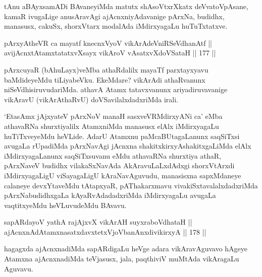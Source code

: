 \begin{artha}
tAnu aBAyxsamADi BAvaneyiMda matutx shAsoVtxrXkatx deVvatoVpAsane,
kamaR ivugaLige anusAravAgi ajAcnxniyAdavanige pArxNa, budidhx,
manasusx, cakuSx, shorxVtarx modalAda iMdirxyagaLu huTuTxtatxve.
\end{artha}


\begin{shl}
pArxyAtheVR ca mayatf knecnxVyoV vikArAdeVniRSeVdhanAtf || \\
avijAcnxtAtamxtatatxvXsayx vikAroV vA\s satxvXdoVSataH \hfill || 177 ||  
\end{shl}

\begin{artha}
pArxcuyaR (bAhuLayx)veMba athaRdalilx mayaTf parxtayxyavu
baMdideyeMdu tiLiyabeVku. EkeMdare? vikArAdi athaRvanunx
niSeVdhisiruvudariMda. athavA Atamx tatavxvanunx ariyadiruvavanige
vikAravU (vikArAthaRvU) doVSavilalxdadxriMda irali.
\end{artha}

\begin{artha}
`EtasAmx jAjxyateV pArxNoV manaH sasxveVRMdirxyANi ca' eMba athavaRNa shurxtiyalilx AtamxniMda manasusx elAlx
iMdirxyagaLu huTiTxveyeMdu heVLide. AdarU Atamxnu paMcaBUtagaLanunx
saqSiTxsi avugaLa rUpadiMda pArxNavAgi jAcnxna
shakitxkirxyAshakitxgaLiMda elAlx iMdirxyagaLanunx saqSiTxsuvanu
eMdu athavaRNa shurxtiya athaR, pArxNaveV budidhx vilakaSxNavAda
AkAravuLaLxdAdxgi shorxVtArxdi iMdirxyagaLigU viSayagaLigU
kAraNavAguvudu, manasisxna sapxMdaneye calaneye devxYtaveMdu
tAtapxyaR, pAThakarxmavu vivakiSxtavalalxdadxriMda pArxNabudidhxgaLa
kAyaRvAdadadxriMda iMdirxyagaLu avugaLa vaqtitxyeMdu heVLuvudeMdu
BAvavu.
\end{artha}

\begin{shl}
sapARdayoV yathA rajAjxvX vikArAH suyxraboVdhataH || \\
ajAcnxnAdAtamxnasatxdavxtetxVjoVbanAnxdivikirxyA \hfill || 178 ||  
\end{shl}

\begin{artha}
hagagxda ajAcnxnadiMda sapARdigaLu heVge adara vikAravAguvavo hAgeye
Atamxna ajAcnxnadiMda teVjasusx, jala, paqthiviV muMtAda vikAragaLu
Aguvavu.
\end{artha}


